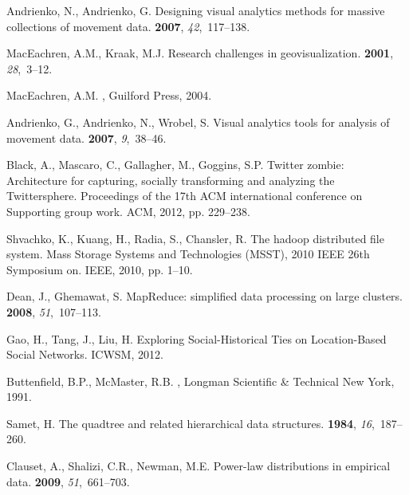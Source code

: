 \documentclass{elsart}
\begin{document}
\begin{thebibliography}{00}
Andrienko, N., Andrienko, G.
\newblock Designing visual analytics methods for massive collections of
  movement data.
 {\bf 2007}, {\em 42},~117--138.

MacEachren, A.M., Kraak, M.J.
\newblock Research challenges in geovisualization.
 {\bf 2001}, {\em
  28},~3--12.

MacEachren, A.M.
,
  Guilford Press,  2004.

Andrienko, G., Andrienko, N., Wrobel, S.
\newblock Visual analytics tools for analysis of movement data.
 {\bf 2007}, {\em 9},~38--46.

Black, A., Mascaro, C., Gallagher, M., Goggins, S.P.
\newblock Twitter zombie: Architecture for capturing, socially transforming and
  analyzing the Twittersphere.
\newblock  Proceedings of the 17th ACM international conference on Supporting
  group work. ACM,  2012, pp. 229--238.

Shvachko, K., Kuang, H., Radia, S., Chansler, R.
\newblock The hadoop distributed file system.
\newblock  Mass Storage Systems and Technologies (MSST), 2010 IEEE 26th
  Symposium on. IEEE,  2010, pp. 1--10.

Dean, J., Ghemawat, S.
\newblock MapReduce: simplified data processing on large clusters.
 {\bf 2008}, {\em 51},~107--113.

Gao, H., Tang, J., Liu, H.
\newblock Exploring Social-Historical Ties on Location-Based Social Networks.
\newblock  ICWSM,  2012.

Buttenfield, B.P., McMaster, R.B.
,
  Longman Scientific \& Technical New York,  1991.

Samet, H.
\newblock The quadtree and related hierarchical data structures.
 {\bf 1984}, {\em 16},~187--260.

Clauset, A., Shalizi, C.R., Newman, M.E.
\newblock Power-law distributions in empirical data.
 {\bf 2009}, {\em 51},~661--703.


\end{thebibliography}
\end{document}
